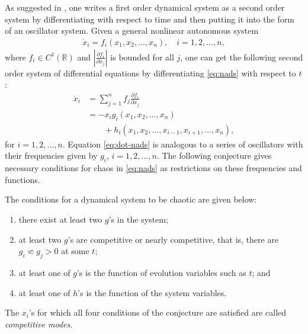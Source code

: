As suggested in \cite{Pei06}, one writes a first 
order dynamical system as a second order system by differentiating with respect to 
time and then putting it into the form of an oscillator system. Given a general 
nonlinear autonomous system
\begin{align} \label{eq:nads}
\dot x_i = f_i(x_1,x_2, \ldots, x_n), \quad i =1,2,\ldots,n,
\end{align}
where $f_i \in C^1(\mathbb{R})$ and $\left|\frac{\partial f_i}{\partial x_j} \right|$ 
is bounded for all $j$, one can get the following second order system of 
differential equations by differentiating \eqref{eq:nads} with respect to $t$:
\begin{equation}\begin{aligned} \label{eq:dot-nads}
\ddot x_i &= \sum_{j=1}^n f_j \frac{\partial f_i}{\partial x_j}  \\
&= -x_i g_i(x_1,x_2, \ldots, x_n) \\
& \qquad + h_i(x_1,x_2, \ldots, x_{i-1}, x_{i+1}, 
\ldots, x_n),
\end{aligned}\end{equation}
for $i =1,2,\ldots,n$. Equation \eqref{eq:dot-nads} is analogous to a series of oscillators with their frequencies given by $g_i$, $i=1,2,\ldots,n$. The following conjecture gives necessary conditions for chaos in \eqref{eq:nads} as restrictions on these frequencies and functions.

\begin{conjecture} \label{conj:chaos-cond}
The conditions for a dynamical system to be chaotic are given below:
\begin{enumerate}
\item there exist at least two $g$'s in the system;
\item at least two $g$'s are competitive or nearly competitive, that is, there 
are $g_i \backsimeq g_j > 0$ at some $t$;
\item at least one of $g$'s is the function of evolution variables such as $t$; 
and
\item at least one of $h$'s is the function of the system variables.
\end{enumerate}
\end{conjecture}
The $x_i$'s for which all four conditions of the conjecture are satisfied are 
called \emph{competitive modes}.

